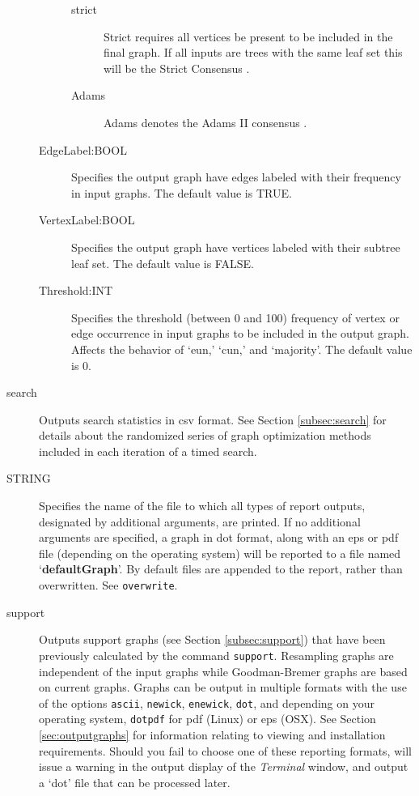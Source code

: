 \begin{description}
\begin{description}
\begin{description}
				\item[strict] Strict requires all vertices be present to be included in the final graph. 
				If all inputs are trees with the same leaf set this will be the Strict Consensus 
				\citep{Schuhandpolhemus1980}. 

				\item[Adams] Adams denotes the Adams II consensus \citep{Adams1972}.
			\end{description}
		
			\item [EdgeLabel:BOOL] Specifies the output graph have edges 
			labeled with their frequency in input graphs. The default value is TRUE.			
			
			\item [VertexLabel:BOOL] Specifies the output graph have vertices 
			labeled with their subtree leaf set. The default value is FALSE.
						
		\item [Threshold:INT] Specifies the threshold  (between 0 and 100) 
		frequency of vertex or edge occurrence in input graphs to be included 
		in the output graph. Affects the behavior of `eun,' `cun,' and `majority'. The default value
		is $0$.
		\end{description}	
				
		\item[search] Outputs search statistics in csv format. See Section 
		\ref{subsec:search} for details about the randomized series of graph 
		optimization methods included in each iteration of a timed search.
			
		\item [STRING] Specifies the name of the file to which all types of report 
		outputs, designated by additional arguments, are printed. If no additional 
		arguments are specified, a graph in dot format, along with an eps or pdf 
		file (depending on the operating system) will be reported to a file named 
		`\textbf{defaultGraph}'. By default files are appended to the report, rather 
		than overwritten. See \texttt{overwrite}.
				
		\item[support] Outputs support graphs (see Section \ref{subsec:support})
		that have been previously calculated by the command \texttt{support}. 
		Resampling graphs \citep{Farrisetal1996} are independent of the input graphs 
		while Goodman-Bremer graphs \citep{Goodmanetal1982, bremer1994} are 
		based on current graphs. Graphs can be output in multiple formats with the
		use of the options \texttt{ascii}, \texttt{newick}, \texttt{enewick}, \texttt{dot}, 
		and depending on your operating system, \texttt{dotpdf} for pdf (Linux) or 
		eps (OSX). See Section \ref{sec:outputgraphs} for information relating to 
		viewing and installation requirements. Should you fail to choose one of 
		these reporting formats, \phyg will issue a warning in the output display 
		of the \textit{Terminal} window, and output a `dot' file that can be processed 
		later.
		

\end{description}
